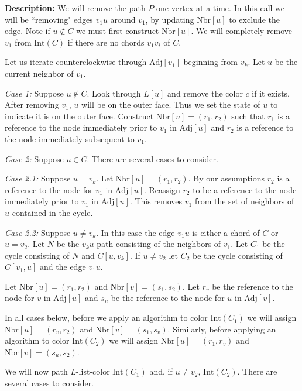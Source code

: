 \documentclass[letterpaper, 12pt]{article}
\theoremstyle{thm}
\begin{document}
\noindent\textbf{Description:} We will remove the path $P$ one vertex at a
time. In this call we will be ``removing" edges $v_1u$ around $v_1$, by updating
$\text{Nbr}[u]$ to exclude the edge. Note if $u\not\in C$ we must first
construct $\text{Nbr}[u]$. We will completely remove $v_1$ from
$\text{Int}(C)$ if there are no chords $v_1v_i$ of $C$.

Let us iterate counterclockwise through $\text{Adj}[v_1]$ beginning from $v_k$.
Let $u$ be the current neighbor of $v_1$.

\textit{Case 1:} Suppose $u\not\in C$. Look through $L[u]$ and remove the color
$c$ if it exists. After removing $v_1$, $u$ will be on the
outer face. Thus we set the state of $u$ to indicate it is
on the outer face. Construct $\text{Nbr}[u]=(r_1,r_2)$ such that
$r_1$ is a reference to the node immediately prior to $v_1$ in $\text{Adj}[u]$
and $r_2$ is a reference to the node immediately subsequent to $v_1$.

\textit{Case 2:} Suppose $u\in C$. There are several cases to consider.

\textit{Case 2.1:} Suppose $u=v_k$. Let $\text{Nbr}[u]=(r_1,r_2)$. By our
assumptions $r_2$ is a reference to the node for $v_1$ in $\text{Adj}[u]$.
Reassign $r_2$ to be a reference to the node immediately prior to $v_1$ in
$\text{Adj}[u]$. This removes $v_1$ from the set of neighbors of $u$ contained
in the cycle.

\textit{Case 2.2:} Suppose $u\ne v_k$. In this case the edge $v_1u$ is either a
chord of $C$ or $u=v_2$. Let $N$ be the $v_ku$-path consisting of the neighbors
of $v_1$. Let $C_1$ be the cycle consisting of $N$ and $C[u,v_k]$. If $u\ne v_2$
let $C_2$ be the cycle consisting of $C[v_1,u]$ and the edge $v_1u$.

Let $\text{Nbr}[u]=(r_1,r_2)$ and
$\text{Nbr}[v]=(s_1,s_2)$. Let $r_v$ be the reference to the node for
$v$ in $\text{Adj}[u]$ and $s_u$ be the reference to the node for $u$ in
$\text{Adj}[v]$.

In all cases below, before we apply an algorithm to color
$\text{Int}(C_1)$ we will assign $\text{Nbr}[u]=(r_v,r_2)$ and $\text{Nbr}[v]=
(s_1,s_v)$. Similarly, before applying an algorithm to color $\text{Int}(C_2)$
we will assign $\text{Nbr}[u]=(r_1,r_v)$ and $\text{Nbr}[v]=(s_u,s_2)$.

We will now path $L$-list-color $\text{Int}(C_1)$ and, if $u\ne v_2$,
$\text{Int}(C_2)$. There are several cases to consider.
\end{document}
